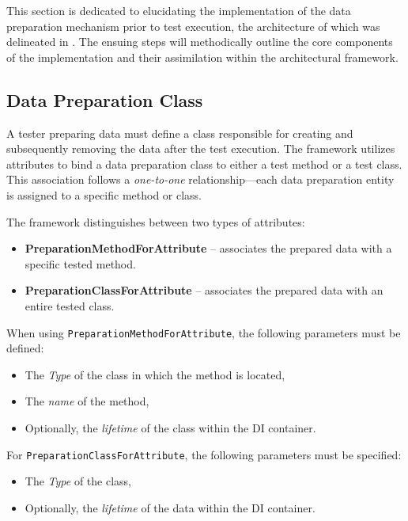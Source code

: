 This section is dedicated to elucidating the implementation of the data preparation mechanism prior to test execution, the architecture of which was delineated in . The ensuing steps will methodically outline the core components of the implementation and their assimilation within the architectural framework.

\subsection{Data Preparation Class}

A tester preparing data must define a class responsible for creating and subsequently removing the data after the test execution. The framework utilizes attributes to bind a data preparation class to either a test method or a test class. This association follows a \textit{one-to-one} relationship—each data preparation entity is assigned to a specific method or class.

The framework distinguishes between two types of attributes:

\begin{itemize}
    \item \textbf{PreparationMethodForAttribute} – associates the prepared data with a specific tested method.
    \item \textbf{PreparationClassForAttribute} – associates the prepared data with an entire tested class.
\end{itemize}

When using \texttt{PreparationMethodForAttribute}, the following parameters must be defined:

\begin{itemize}
    \item The \textit{Type} of the class in which the method is located,
    \item The \textit{name} of the method,
    \item Optionally, the \textit{lifetime} of the class within the \ac{DI} container.
\end{itemize}

For \texttt{PreparationClassForAttribute}, the following parameters must be specified:

\begin{itemize}
    \item The \textit{Type} of the class,
    \item Optionally, the \textit{lifetime} of the data within the \ac{DI} container.
\end{itemize}

